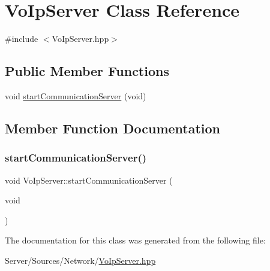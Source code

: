 \hypertarget{classVoIpServer}{}\section{Vo\+Ip\+Server Class Reference}
\label{classVoIpServer}


{\ttfamily \#include $<$Vo\+Ip\+Server.\+hpp$>$}

\subsection*{Public Member Functions}
\begin{DoxyCompactItemize}
\item 
void \hyperlink{classVoIpServer_af0a9441bdf1a8b480eaa5298aa57a84d}{start\+Communication\+Server} (void)
\end{DoxyCompactItemize}


\subsection{Member Function Documentation}
\mbox{\label{classVoIpServer_af0a9441bdf1a8b480eaa5298aa57a84d}} 
\subsubsection{\texorpdfstring{start\+Communication\+Server()}{startCommunicationServer()}}
{\footnotesize\ttfamily void Vo\+Ip\+Server\+::start\+Communication\+Server (\begin{DoxyParamCaption}\item[{void}]{ }\end{DoxyParamCaption})}



The documentation for this class was generated from the following file\+:\begin{DoxyCompactItemize}
\item 
Server/\+Sources/\+Network/\hyperlink{VoIpServer_8hpp}{Vo\+Ip\+Server.\+hpp}\end{DoxyCompactItemize}
